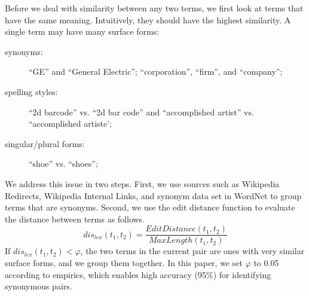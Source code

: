 Before we deal with similarity between any two terms, we first look at
terms that have the same meaning. Intuitively, they should have the
highest similarity.  A single term may have many surface forms:
\begin{description}
\item[synonyms:] ``GE'' and ``General Electric''; ``corporation'', ``firm'', and ``company'';
\item[spelling styles:] ``2d barcode'' vs. ``2d bar code'' and  ``accomplished artist'' vs.
``accomplished artiste';
\item[singular/plural forms:] ``shoe'' vs. ``shoes'';
\end{description}

We address this issue in two steps.  First, we use sources such as
Wikipedia Redirects, Wikipedia Internal Links, and synonym data set in
WordNet to group terms that are synonyms.  Second, we use the edit
distance function to evaluate the distance between terms as follows.
\begin{equation*}
dis_{lex}(t_{1}, t_{2}) = \frac{EditDistance(t_{1}, t_{2})}{MaxLength(t_{1}, t_{2})}
\label{eq:lexDist*}
\end{equation*}
If $dis_{lex}(t_{1}, t_{2}) < \varphi$, the two terms in the current pair are ones with very similar surface forms, and we group them together.
In this paper, we set $\varphi$ to 0.05
according to empirics, which enables high accuracy (95\%)
for identifying synonymous pairs.

